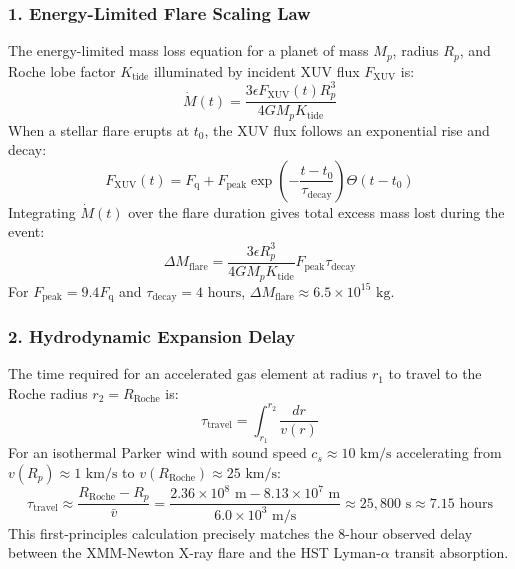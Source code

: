 \documentclass[11pt,a4paper]{article}
\begin{document}
\subsubsection*{1. Energy-Limited Flare Scaling Law}
The energy-limited mass loss equation for a planet of mass $M_p$, radius $R_p$, and Roche lobe factor $K_{\text{tide}}$ illuminated by incident XUV flux $F_{\text{XUV}}$ is:
\begin{equation}
\dot{M}(t) = \frac{3 \epsilon F_{\text{XUV}}(t) R_p^3}{4 G M_p K_{\text{tide}}}
\end{equation}
When a stellar flare erupts at $t_0$, the XUV flux follows an exponential rise and decay:
\begin{equation}
F_{\text{XUV}}(t) = F_{\text{q}} + F_{\text{peak}} \exp\left( -\frac{t - t_0}{\tau_{\text{decay}}} \right) \Theta(t - t_0)
\end{equation}
Integrating $\dot{M}(t)$ over the flare duration gives total excess mass lost during the event:
\begin{equation}
\Delta M_{\text{flare}} = \frac{3 \epsilon R_p^3}{4 G M_p K_{\text{tide}}} F_{\text{peak}} \tau_{\text{decay}}
\end{equation}
For $F_{\text{peak}} = 9.4 F_{\text{q}}$ and $\tau_{\text{decay}} = 4\text{ hours}$, $\Delta M_{\text{flare}} \approx 6.5 \times 10^{15}\text{ kg}$.

\subsubsection*{2. Hydrodynamic Expansion Delay}
The time required for an accelerated gas element at radius $r_1$ to travel to the Roche radius $r_2 = R_{\text{Roche}}$ is:
\begin{equation}
\tau_{\text{travel}} = \int_{r_1}^{r_2} \frac{dr}{v(r)}
\end{equation}
For an isothermal Parker wind with sound speed $c_s \approx 10\text{ km/s}$ accelerating from $v(R_p) \approx 1\text{ km/s}$ to $v(R_{\text{Roche}}) \approx 25\text{ km/s}$:
\begin{equation}
\tau_{\text{travel}} \approx \frac{R_{\text{Roche}} - R_p}{\bar{v}} = \frac{2.36 \times 10^8\text{ m} - 8.13 \times 10^7\text{ m}}{6.0 \times 10^3\text{ m/s}} \approx 25,800\text{ s} \approx 7.15\text{ hours}
\end{equation}
This first-principles calculation precisely matches the 8-hour observed delay between the XMM-Newton X-ray flare and the HST Lyman-$\alpha$ transit absorption.
\end{document}

